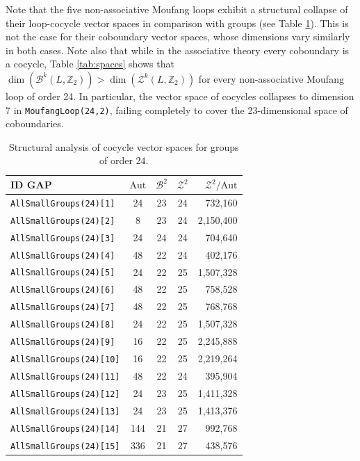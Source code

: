 \documentclass[11pt,a4paper]{article}
\begin{document}
Note that the five non-associative Moufang loops exhibit a structural collapse of their loop-cocycle vector spaces in comparison with groups (see Table \ref{tab:spaces_2}). This is not the case for their coboundary vector spaces, whose dimensions vary similarly in both cases. Note also that while in the associative theory every coboundary is a cocycle, Table \ref{tab:spaces} shows that $\dim(\mathcal{B}^k(L,\mathbb{Z}_2))>\dim(\mathcal{Z}^k(L,\mathbb{Z}_2))$ for every non-associative Moufang loop of order 24. In particular, the vector space of cocycles collapses to dimension 7 in \texttt{MoufangLoop(24,2)}, failing completely to cover the 23-dimensional space of coboundaries.

\begin{table}[ht]
\centering
\caption{Structural analysis of cocycle vector spaces for groups of order 24.}
\label{tab:spaces_2}
\begin{tabular}{@{}lcccr}
\toprule
\textbf{ID GAP} &  \textbf{$\mathrm{Aut}$} & \textbf{$\mathcal{B}^2$} & \textbf{$\mathcal{Z}^2$}  & \textbf{$\mathcal{Z}^2/\mathrm{Aut}$} \\ \midrule
\texttt{AllSmallGroups(24)[1]} & 24 & 23 & 24& 732,160\\
\texttt{AllSmallGroups(24)[2]} & 8 & 23 & 24 & 2,150,400\\
\texttt{AllSmallGroups(24)[3]} & 24 & 24 & 24 &704,640\\
\texttt{AllSmallGroups(24)[4]} & 48 & 22 & 24 &402,176\\
\texttt{AllSmallGroups(24)[5]} & 24 & 22 & 25 &1,507,328\\
\texttt{AllSmallGroups(24)[6]} & 48 & 22& 25& 758,528\\
\texttt{AllSmallGroups(24)[7]} & 48 & 22& 25& 768,768\\
\texttt{AllSmallGroups(24)[8]} & 24 & 22& 25& 1,507,328\\
\texttt{AllSmallGroups(24)[9]} & 16 & 22& 25& 2,245,888\\
\texttt{AllSmallGroups(24)[10]} & 16 & 22& 25& 2,219,264\\
\texttt{AllSmallGroups(24)[11]} & 48 & 22& 24& 395,904\\
\texttt{AllSmallGroups(24)[12]} & 24 & 23& 25& 1,411,328\\
\texttt{AllSmallGroups(24)[13]} & 24 & 23& 25& 1,413,376\\
\texttt{AllSmallGroups(24)[14]} & 144 & 21& 27&992,768\\
\texttt{AllSmallGroups(24)[15]} & 336 & 21& 27&438,576\\
\bottomrule
\end{tabular}
\end{table}
\end{document}

